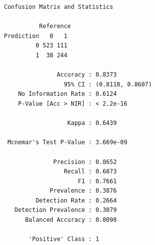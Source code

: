 \documentclass[
  letterpaper,
  DIV=11,
  numbers=noendperiod]{scrartcl}
\newenvironment{Shaded}{\begin{snugshade}}{\end{snugshade}}
\newcommand{\AttributeTok}[1]{\textcolor[rgb]{0.40,0.45,0.13}{#1}}
\newcommand{\FunctionTok}[1]{\textcolor[rgb]{0.28,0.35,0.67}{#1}}
\newcommand{\NormalTok}[1]{\textcolor[rgb]{0.00,0.23,0.31}{#1}}
\newcommand{\OtherTok}[1]{\textcolor[rgb]{0.00,0.23,0.31}{#1}}
\newcommand{\SpecialCharTok}[1]{\textcolor[rgb]{0.37,0.37,0.37}{#1}}
\newcommand{\StringTok}[1]{\textcolor[rgb]{0.13,0.47,0.30}{#1}}
\begin{document}
\begin{verbatim}
Confusion Matrix and Statistics

          Reference
Prediction   0   1
         0 523 111
         1  38 244
                                          
               Accuracy : 0.8373          
                 95% CI : (0.8118, 0.8607)
    No Information Rate : 0.6124          
    P-Value [Acc > NIR] : < 2.2e-16       
                                          
                  Kappa : 0.6439          
                                          
 Mcnemar's Test P-Value : 3.669e-09       
                                          
              Precision : 0.8652          
                 Recall : 0.6873          
                     F1 : 0.7661          
             Prevalence : 0.3876          
         Detection Rate : 0.2664          
   Detection Prevalence : 0.3079          
      Balanced Accuracy : 0.8098          
                                          
       'Positive' Class : 1               
                                          
\end{verbatim}

\begin{Shaded}
\end{Shaded}
\end{document}
